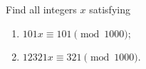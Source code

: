 Find all integers $x$ satisfying
\begin{enumerate}
\item[(a)] $101x\equiv101\pmod{1000}$;
\item[(b)] $12321x\equiv321\pmod{1000}$.
\end{enumerate}

